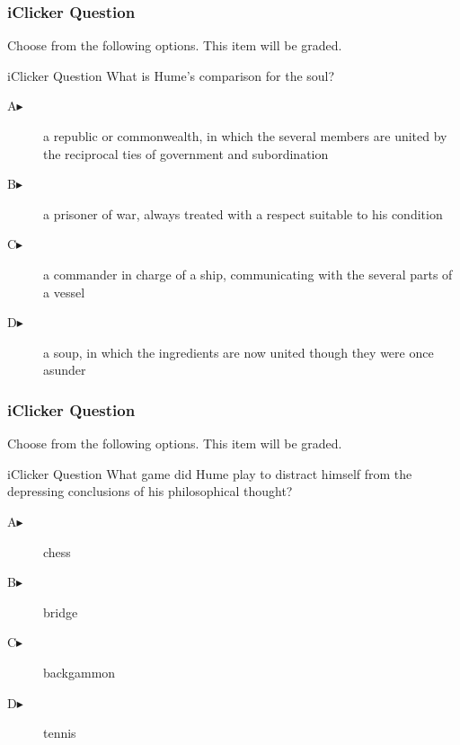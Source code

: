 \documentclass[xcolor=dvipsnames]{beamer}
\begin{document}
\begin{frame}
  \frametitle{iClicker Question}
Choose from the following options. This item will be graded.
\begin{block}{iClicker Question}
What is Hume's comparison for the soul?
\end{block}
\begin{description}
\item[A\hspace{.2in}$\blacktriangleright$] a republic or commonwealth, in which the several members are united by the reciprocal ties of government and subordination
\item[B\hspace{.2in}$\blacktriangleright$] a prisoner of war, always treated with a respect suitable to his condition
\item[C\hspace{.2in}$\blacktriangleright$] a commander in charge of a ship, communicating with the several parts of a vessel
\item[D\hspace{.2in}$\blacktriangleright$] a soup, in which the ingredients are now united though they were once asunder
\end{description}
\end{frame}

\begin{frame}
  \frametitle{iClicker Question}
Choose from the following options. This item will be graded.
\begin{block}{iClicker Question}
What game did Hume play to distract himself from the depressing
conclusions of his philosophical thought?
\end{block}
\begin{description}
\item[A\hspace{.2in}$\blacktriangleright$] chess
\item[B\hspace{.2in}$\blacktriangleright$] bridge
\item[C\hspace{.2in}$\blacktriangleright$] backgammon
\item[D\hspace{.2in}$\blacktriangleright$] tennis
\end{description}
\end{frame}
\end{document}
